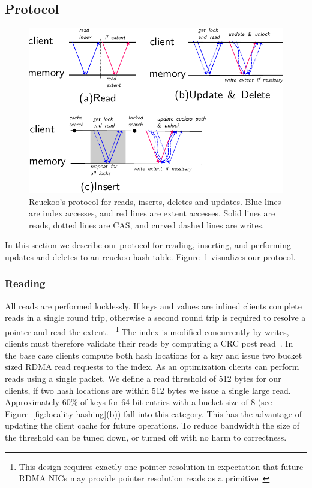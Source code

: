 \subsection{Protocol}

\begin{figure}[t]
\includegraphics[width=0.99\linewidth]{fig/message_diagram.pdf}

\caption{Rcuckoo's protocol for reads, inserts, deletes and
updates. Blue lines are index accesses, and red lines are
extent accesses. Solid lines are reads, dotted lines are
CAS, and curved dashed lines are writes.}

\label{fig:message_diagram}
\end{figure}

In this section we describe our protocol for reading,
inserting, and performing updates and deletes to an rcuckoo
hash table. Figure~\ref{fig:message_diagram} visualizes our
protocol.

\subsubsection{Reading} 
\label{sec:reading}
All reads are performed locklessly.
If keys and values are inlined clients complete reads in a
single round trip, otherwise a second round trip is required
to resolve a pointer and read the extent. 
~\footnote{This design requires exactly one pointer
resolution in expectation that future RDMA NICs may provide
pointer resolution reads as a primitive~\cite{prism}}
The index is modified concurrently by writes, clients must
therefore validate their reads by computing a CRC post
read~\cite{pilaf,cell}.
In the base case clients compute both hash locations for a
key and issue two bucket sized RDMA read requests to the
index. As an optimization clients can perform reads using a
single packet. We define a read threshold of 512 bytes for
our clients, if two hash locations are within 512 bytes we
issue a single large read.  Approximately 60\% of keys for
64-bit entries with a bucket size of 8 (see
Figure~\ref{fig:locality-hashing}(b)) fall into this
category. This has the advantage of updating the client
cache for future operations.
To reduce bandwidth the size
of the threshold can be tuned down, or turned off with no
harm to correctness.

